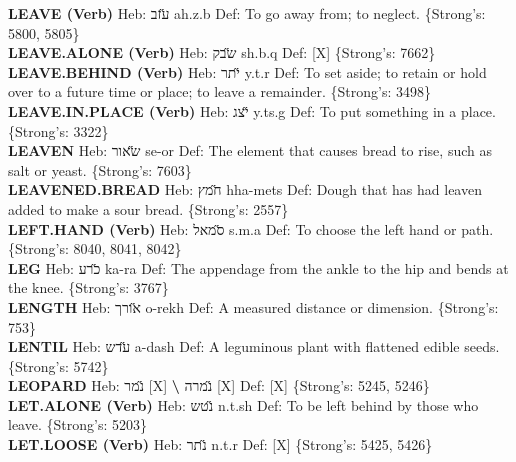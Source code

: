 {\textbf{LEAVE (Verb)} Heb: {\large\H עזב} ah.z.b Def: To go away from; to neglect. \{Strong's: 5800, 5805\}\hfill{}\\

\textbf{LEAVE.ALONE (Verb)} Heb: {\large\H שבק} sh.b.q Def: {[}X{]} \{Strong's: 7662\}\hfill{}\\

\textbf{LEAVE.BEHIND (Verb)} Heb: {\large\H יתר} y.t.r Def: To set aside; to retain or hold over to a future time or place; to leave a remainder. \{Strong's: 3498\}\hfill{}\\

\textbf{LEAVE.IN.PLACE (Verb)} Heb: {\large\H יצג} y.ts.g Def: To put something in a place. \{Strong's: 3322\}\hfill{}\\

\textbf{LEAVEN} Heb: {\large\H שאור} se-or Def: The element that causes bread to rise, such as salt or yeast. \{Strong's: 7603\}\hfill{}\\

\textbf{LEAVENED.BREAD} Heb: {\large\H חמץ} hha-mets Def: Dough that has had leaven added to make a sour bread. \{Strong's: 2557\}\hfill{}\\

\textbf{LEFT.HAND (Verb)} Heb: {\large\H סמאל} s.m.a Def: To choose the left hand or path. \{Strong's: 8040, 8041, 8042\}\hfill{}\\

\textbf{LEG} Heb: {\large\H כרע} ka-ra Def: The appendage from the ankle to the hip and bends at the knee. \{Strong's: 3767\}\hfill{}\\

\textbf{LENGTH} Heb: {\large\H אורך} o-rekh Def: A measured distance or dimension. \{Strong's: 753\}\hfill{}\\

\textbf{LENTIL} Heb: {\large\H עדש} a-dash Def: A leguminous plant with flattened edible seeds. \{Strong's: 5742\}\hfill{}\\

\textbf{LEOPARD} Heb: {\large\H נמר} {[}X{]} \textbf{\textbackslash{}} {\large\H נמרה} {[}X{]} Def: {[}X{]} \{Strong's: 5245, 5246\}\hfill{}\\

\textbf{LET.ALONE (Verb)} Heb: {\large\H נטש} n.t.sh Def: To be left behind by those who leave. \{Strong's: 5203\}\hfill{}\\

\textbf{LET.LOOSE (Verb)} Heb: {\large\H נתר} n.t.r Def: {[}X{]} \{Strong's: 5425, 5426\}\hfill{}\\

}
